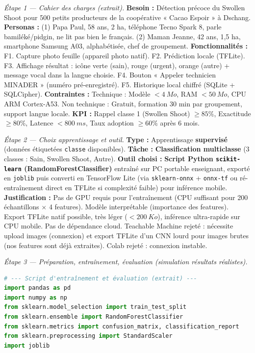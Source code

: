 \documentclass[11pt]{article}
\newcounter{popsec}
\newcounter{popsub}
\newcommand{\courssub}[1]{%
  \stepcounter{popsub}%
  \par\vspace{9pt}\noindent{\popxbold\fontsize{11.5}{13}\selectfont\color{popink}{\color{poporange}\thepopsec.\thepopsub}\hspace{6pt}#1}\par\nopagebreak\vspace{4pt}
}
\begin{document}
\courssub{Démarche et corrigé commenté}
\begin{exoresolu}
\emph{Étape 1 — Cahier des charges (extrait).}
\textbf{Besoin :} Détection précoce du Swollen Shoot pour 500 petits producteurs de la coopérative « Cacao Espoir » à Dschang.
\textbf{Personas :} (1) Papa Paul, 58 ans, 2 ha, téléphone Tecno Spark 8, parle bamiléké/pidgin, ne lit pas bien le français. (2) Maman Jeanne, 42 ans, 1,5 ha, smartphone Samsung A03, alphabétisée, chef de groupement.
\textbf{Fonctionnalités :} F1. Capture photo feuille (appareil photo natif). F2. Prédiction locale (TFLite). F3. Affichage résultat : icône verte (sain), rouge (urgent), orange (autre) + message vocal dans la langue choisie. F4. Bouton « Appeler technicien MINADER » (numéro pré-enregistré). F5. Historique local chiffré (SQLite + SQLCipher).
\textbf{Contraintes :} Technique : Modèle $< \SI{4}{Mo}$, RAM $< \SI{50}{Mo}$, CPU ARM Cortex-A53. Non technique : Gratuit, formation 30 min par groupement, support langue locale.
\textbf{KPI :} Rappel classe 1 (Swollen Shoot) $\ge 85\%$, Exactitude $\ge 80\%$, Latence $< \SI{800}{ms}$, Taux adoption $\ge 60\%$ après 6 mois.

\emph{Étape 2 — Choix apprentissage et outil.}
\textbf{Type :} Apprentissage \textbf{supervisé} (données étiquetées \texttt{classe} disponibles). \textbf{Tâche :} \textbf{Classification multiclasse} (3 classes : Sain, Swollen Shoot, Autre).
\textbf{Outil choisi :} \textbf{Script Python \texttt{scikit-learn} (RandomForestClassifier)} entraîné sur PC portable enseignant, exporté en \texttt{joblib} puis converti en TensorFlow Lite (via \texttt{sklearn-onnx} + \texttt{onnx-tf} ou ré-entraînement direct en TFLite si complexité faible) pour inférence mobile.
\textbf{Justification :} Pas de GPU requis pour l'entraînement (CPU suffisant pour 200 échantillons $\times$ 4 features). Modèle interprétable (importance des features). Export TFLite natif possible, très léger ($< \SI{200}{Ko}$), inférence ultra-rapide sur CPU mobile. Pas de dépendance cloud. Teachable Machine rejeté : nécessite upload images (connexion) et export TFLite d'un CNN lourd pour images brutes (nos features sont déjà extraites). Colab rejeté : connexion instable.

\emph{Étape 3 — Préparation, entraînement, évaluation (simulation résultats réalistes).}
\begin{lstlisting}[language=Python]
# --- Script d'entraînement et évaluation (extrait) ---
import pandas as pd
import numpy as np
from sklearn.model_selection import train_test_split
from sklearn.ensemble import RandomForestClassifier
from sklearn.metrics import confusion_matrix, classification_report
from sklearn.preprocessing import StandardScaler
import joblib


\end{lstlisting}
\end{exoresolu}
\end{document}
